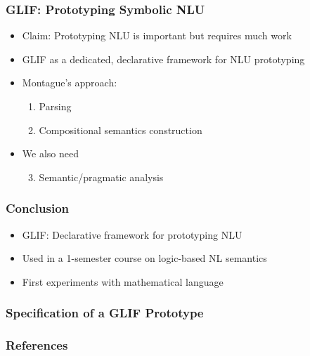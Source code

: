 \documentclass[aspectratio=169]{beamer}
\begin{document}
\begin{frame}
    \frametitle{GLIF: Prototyping Symbolic NLU}
    \begin{itemize}
        \item Claim: Prototyping NLU is important but requires much work
        \item GLIF as a dedicated, declarative framework for NLU prototyping
        \item Montague's approach:
            \begin{enumerate}
                \item Parsing
                \item Compositional semantics construction
            \end{enumerate}
        \item We also need
            \begin{enumerate}
                \setcounter{enumi}{2}
                \item Semantic/pragmatic analysis
            \end{enumerate}
    \end{itemize}
\end{frame}









\begin{frame}
    \frametitle{Conclusion}
    \begin{itemize}
        \item GLIF: Declarative framework for prototyping NLU
        \item Used in a 1-semester course on logic-based NL semantics
        \item First experiments with mathematical language
    \end{itemize}

    \centering
    \vspace{1.5em}
    \par
\end{frame}

\appendix

\begin{frame}
    \frametitle{Specification of a GLIF Prototype}
    
\end{frame}

\begin{frame}[allowframebreaks,t]
    \frametitle{References}
    \printbibliography
\end{frame}
\end{document}
